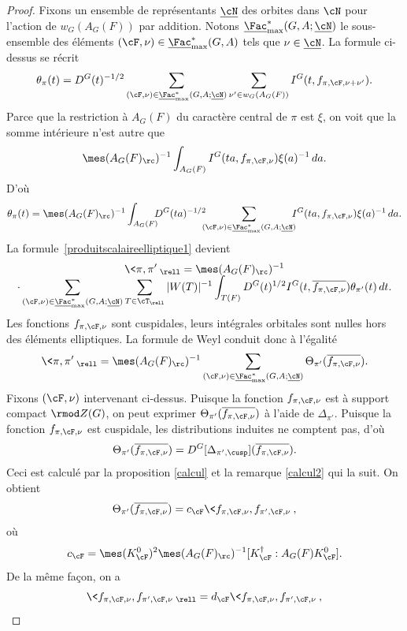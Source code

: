 \begin{proof}
Fixons un ensemble de représentants $\underline{\cN}$ des orbites dans $\cN$ pour l'action de $w_{G}(A_{G}(F))$ par addition. Notons $ \underline{\Fac}^*_{\max}(G,A;\underline\cN)$ le sous-ensemble des éléments $(\cF,\nu)\in \underline{\Fac}^*_{\max}(G,A)$ tels que $\nu\in \underline{\cN}$.
La formule ci-dessus se récrit
\[
\theta_{\pi}(t)=D^G(t)^{-1/2}\sum_{(\cF,\nu)\in \underline{\Fac}^*_{\max}(G,A;\underline{\cN})} \sum_{\nu'\in w_{G}(A_{G}(F))}I^G(t,f_{\pi,\cF,\nu+\nu'}).
\]
Parce que la restriction à $A_{G}(F)$ du caractère central de $\pi$ est $\xi$, on voit que la somme intérieure n'est autre que
\[
\mes(A_{G}(F)_{\rc})^{-1}\int_{A_{G}(F)}I^G(ta,f_{\pi,\cF,\nu})\xi(a)^{-1}\,da.
\]
D'où
\[
\theta_{\pi}(t)=\mes(A_{G}(F)_{\rc})^{-1}\int_{A_{G}(F)}\hspace*{-2mm} D^G(ta)^{-1/2}\hspace*{-2mm}\sum_{(\cF,\nu)\in \underline{\Fac}^*_{\max}(G,A;\underline{\cN})}\hspace*{-2mm}I^G(ta,f_{\pi,\cF,\nu})\xi(a)^{-1}\,da.
\]
La formule~\eqref{produitscalaireelliptique1} devient
\begin{multline*}
\<\pi,\pi'\>_{\rell}=\mes(A_{G}(F)_{\rc})^{-1}\\[-5pt]
\cdot\sum_{(\cF,\nu)\in \underline{\Fac}^*_{\max}(G,A;\underline{\cN})} \sum_{T\in \cT_{\rell}}\vert W(T)\vert ^{-1}\int_{T(F)}D^G(t)^{1/2}I^G(t,\overline{f_{\pi,\cF,\nu}})\theta_{\pi'}(t)\,dt.
\end{multline*}
Les fonctions $f_{\pi,\cF,\nu}$ sont cuspidales, leurs intégrales orbitales sont nulles hors des éléments elliptiques. La formule de Weyl conduit donc à l'égalité
\[
\<\pi,\pi'\>_{\rell}=\mes(A_{G}(F)_{\rc})^{-1}\sum_{(\cF,\nu)\in \underline{\Fac}^*_{\max}(G,A;\underline{\cN})} \Theta_{\pi'}(\overline{f_{\pi,\cF,\nu}}).
\]
Fixons $(\cF,\nu)$ intervenant ci-dessus. Puisque la fonction $f_{\pi,\cF,\nu}$ est à support compact $\rmod Z(G)$, on peut exprimer $\Theta_{\pi'}(\overline{f_{\pi,\cF,\nu}})$ à l'aide de $\Delta_{\pi'}$. Puisque la fonction $f_{\pi,\cF,\nu}$ est cuspidale, les distributions induites ne comptent pas, d'où
\[
\Theta_{\pi'}(\overline{f_{\pi,\cF,\nu}})=D^G[\Delta_{\pi',\cusp}](\overline{f_{\pi,\cF,\nu}}).
\]
Ceci est calculé par la proposition \ref{calcul} et la remarque \eqref{calcul2} qui la suit. On obtient
\[
\Theta_{\pi'}(\overline{f_{\pi,\cF,\nu}})=c_{\cF}\<f_{\pi,\cF,\nu},f_{\pi',\cF,\nu}\>,
\]
où
\[
c_{\cF}=\mes(K_{\cF}^0)^2\mes(A_{G}(F)_{\rc})^{-1}[K_{\cF}^{\dag}:A_{G}(F)K_{\cF}^0].
\]
De la même façon, on a
\[
\<f_{\pi,\cF,\nu},f_{\pi',\cF,\nu}\>_{\rell}=d_{\cF}\<f_{\pi,\cF,\nu},f_{\pi',\cF,\nu}\>,
\]
\end{proof}
